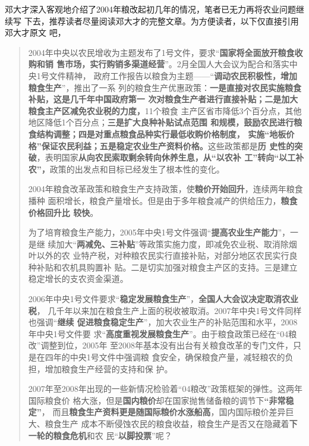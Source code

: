 邓大才深入客观地介绍了2004年粮改起初几年的情况，笔者已无力再将农业问题继续写
下去，推荐读者尽量阅读邓大才的完整文章。为方便读者，以下仅直接引用邓大才原文
吧，
\begin{quotation}
  2004年中央以农民增收为主题发布了1号文件，要求“\textbf{国家将全面放开粮食收购和销
    售市场，实行购销多渠道经营}”。2月全国人大会议为配合和落实中央1号文件精神，
  政府工作报告以粮食为主题——“\textbf{调动农民积极性，增加粮食生产}”，推出了一系
  列的粮食生产优惠政策：\textbf{一是直接对农民实施粮食补贴，这是几千年中国政府第一
    次对粮食生产者进行直接补贴；二是加大粮食主产区减免农业税的力度，}11个粮食
  主产区省市降低3个百分点，其他地区降低1个百分点；\textbf{三是扩大良种补贴试点范围
    和规模，鼓励农民进行粮食结构调整；四是对重点粮食品种实行最低收购价格制度，
    实施“地板价格”保证农民利益；五是稳定农业生产资料价格。}这些政策都是\textbf{历
    史性的突破}，表明国家\textbf{从向农民索取剩余转向休养生息，从“以农补
    工”转向“以工补农”，}政策的出发点和目标已经发生了根本性的变化。

  2004年粮食改革政策和粮食生产支持政策，使\textbf{粮价开始回升}，连续两年粮食播种
  面积增长，粮食产量增长。但是由于多年粮食减产的供给压力，\textbf{粮食价格回升比
    较快}。

  为了培育粮食生产能力，2005年中央1号文件强调“\textbf{提高农业生产能力}”，一是继
  续加大“\textbf{两减免、三补贴}”等政策实施力度，即减免农业税、取消除烟叶以外的农
  业特产税，对种粮农民实行直接补贴，对部分地区农民实行良种补贴和农机具购置补
  贴。二是切实加强对粮食主产区的支持。三是建立稳定增长的支农资金渠道。

  2006年中央1号文件要求“\textbf{稳定发展粮食生产}”，\textbf{全国人大会议决定取消农业税}，
  几千年以来加在粮食生产上面的税收被取消。2007年中央1号文件同样也强调“\textbf{继续
    促进粮食稳定生产}”，加大农业生产的补贴范围和水平，2008年中央1号文件要
  求“\textbf{高度重视发展粮食生产}”。由于粮食政策已经在“04粮改”调整到位，2005年
  至2008年基本没有出台有关粮食改革的专门文件，只是在四年的中央1号文件中强调粮
  食安全，确保粮食产量，减轻粮农的负担，增加粮食生产经营的支持和保
  护。\cite{dacailianggai}

  2007年至2008年出现的一些新情况检验着“04粮改”政策框架的弹性。这两年国际粮食价
  格大涨，但是\textbf{国内粮价}却在国家抛售储备粮的调节下\textbf{“非常稳定”}，
  而且\textbf{粮食生产资料更是随国际粮价水涨船高}，国内国际粮价差异巨大、粮食生产
  成本不断侵蚀农民的粮食收益，粮食生产是否又在隐藏着\textbf{下一轮的粮食危机}和农
  民“\textbf{以脚投票}”呢？
\end{quotation}

